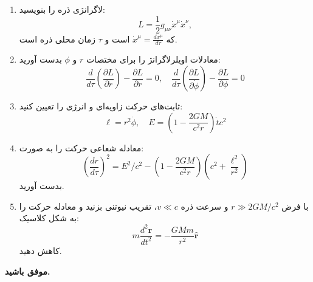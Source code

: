 \documentclass[a4paper,16pt]{article}
\begin{document}
	
	\begin{enumerate}
		\item لاگرانژی ذره را بنویسید:
		\[
		L = \frac{1}{2} g_{\mu\nu} \dot{x}^\mu \dot{x}^\nu,
		\]
		که \(\dot{x}^\mu = \frac{dx^\mu}{d\tau}\) است و \(\tau\) زمان محلی ذره است.
		
		\item معادلات اویلرلاگرانژ را برای مختصات \(r\) و \(\phi\) بدست آورید:
		\[
		\frac{d}{d\tau} \left( \frac{\partial L}{\partial \dot{r}} \right) - \frac{\partial L}{\partial r} = 0, \quad
		\frac{d}{d\tau} \left( \frac{\partial L}{\partial \dot{\phi}} \right) - \frac{\partial L}{\partial \phi} = 0
		\]
		
		\item ثابت‌های حرکت زاویه‌ای و انرژی را تعیین کنید:
		\[
		\ell = r^2 \dot{\phi}, \quad E = \left(1-\frac{2GM}{c^2 r}\right) \dot{t} c^2
		\]
		
		\item معادله شعاعی حرکت را به صورت:
		\[
		\left(\frac{dr}{d\tau}\right)^2 = E^2/c^2 - \left(1-\frac{2GM}{c^2 r}\right)\left(c^2 + \frac{\ell^2}{r^2}\right)
		\]
		بدست آورید.
		
		\item با فرض \(r \gg 2GM/c^2\) و سرعت ذره \(v \ll c\)، تقریب نیوتنی بزنید و معادله حرکت را به شکل کلاسیک:
		\[
		m \frac{d^2 \mathbf{r}}{dt^2} = - \frac{GM m}{r^2} \hat{\mathbf{r}}
		\]
		کاهش دهید.
	\end{enumerate}
	\vspace{10pt}
	\textbf{موفق باشید.}
\end{document}

